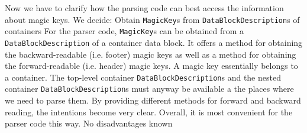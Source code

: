 Now we have to clarify how the parsing code can best access the information about magic keys. We decide:
{%
Obtain \texttt{MagicKey}s from \texttt{DataBlockDescription}s of containers
}
{%
For the parser code, \texttt{MagicKey}s can be obtained from a \texttt{DataBlockDescription} of a container data block. It offers a method for obtaining the backward-readable (i.e. footer) magic keys as well as a method for obtaining the forward-readable (i.e. header) magic keys.
}
{%
A magic key essentially belongs to a container. The top-level container \texttt{DataBlockDescription}s and the nested container \texttt{DataBlockDescription}s must anyway be available a the places where we need to parse them. By providing different methods for forward and backward reading, the intentions become very clear. Overall, it is most convenient for the parser code this way.
}
{%
No disadvantages known
}

